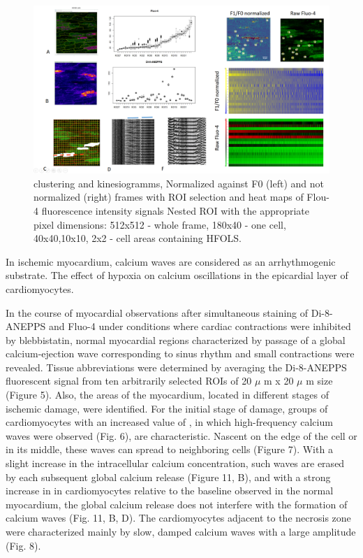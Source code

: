 \documentclass{biophys-new}
\begin{document}
\begin{figure}
    \includegraphics[width=0.9\linewidth]{fig3.png}
    \caption{clustering and kinesiogramms, Normalized against F0 (left) and not normalized (right) frames with ROI selection and heat maps of Flou-4 fluorescence intensity signals Nested ROI with the appropriate pixel dimensions: 512x512 - whole frame, 180x40 - one cell, 40x40,10x10, 2x2 - cell areas containing HFOLS. }
    \label{fig:fig3}
\end{figure}


In ischemic myocardium, calcium waves are considered as an arrhythmogenic substrate.
The effect of hypoxia on calcium oscillations in the epicardial layer of cardiomyocytes.


In the course of myocardial observations after simultaneous staining of Di-8-ANEPPS and Fluo-4 under conditions where cardiac contractions were inhibited by blebbistatin, normal myocardial regions characterized by passage of a global calcium-ejection wave corresponding to sinus rhythm and small contractions were revealed. Tissue abbreviations were determined by averaging the Di-8-ANEPPS fluorescent signal from ten arbitrarily selected ROIs of 20 $\mu$ m x 20 $\mu$ m size (Figure 5). Also, the areas of the myocardium, located in different stages of ischemic damage, were identified. For the initial stage of damage, groups of cardiomyocytes with an increased value of , in which high-frequency calcium waves were observed (Fig. 6), are characteristic. Nascent on the edge of the cell or in its middle, these waves can spread to neighboring cells (Figure 7). With a slight increase in the intracellular calcium concentration, such waves are erased by each subsequent global calcium release (Figure 11, B), and with a strong increase in  in cardiomyocytes relative to the baseline observed in the normal myocardium, the global calcium release does not interfere with the formation of calcium waves (Fig. 11, B, D). The cardiomyocytes adjacent to the necrosis zone were characterized mainly by slow, damped calcium waves with a large amplitude (Fig. 8).
\end{document}

